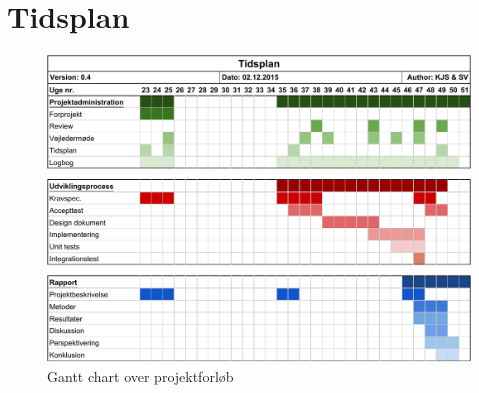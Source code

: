 
\section{Tidsplan}\label{title:tidsplan}
\begin{figure}[H]
	\centering
	\includegraphics[width = 1.3\textwidth, angle=90,origin=c]{billeder/Tidsplanv04.pdf}
	\caption{Gantt chart over projektforløb}
\end{figure}
